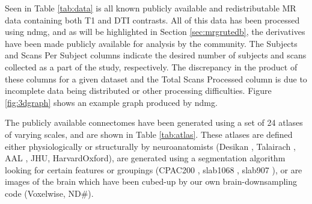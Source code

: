 Seen in Table \ref{tab:data} is all known publicly available and redistributable MR data containing both T1 and DTI contrasts. All of this data has been processed using ndmg, and as will be highlighted in Section \ref{sec:mrgrutedb}, the derivatives have been made publicly available for analysis by the community. The Subjects and Scans Per Subject columns indicate the desired number of subjects and scans collected as a part of the study, respectively. The discrepancy in the product of these columns for a given dataset and the Total Scans Processed column is due to incomplete data being distributed or other processing difficulties. Figure \ref{fig:3dgraph} shows an example graph produced by ndmg.


The publicly available connectomes have been generated using a set of 24 atlases of varying scales, and are shown in Table \ref{tab:atlas}. These atlases are defined either physiologically or structurally by neuroanatomists (Desikan \cite{desikan} , Talairach \cite{talairach}, AAL \cite{aal}, JHU\cite{jhu}, HarvardOxford\cite{harvardoxford}), are generated using a segmentation algorithm looking for certain features or groupings (CPAC200 \cite{cpac}, slab1068 \cite{slab1068}, slab907 \cite{slab907}), or are images of the brain which have been cubed-up by our own brain-downsampling code (Voxelwise, ND\#).

